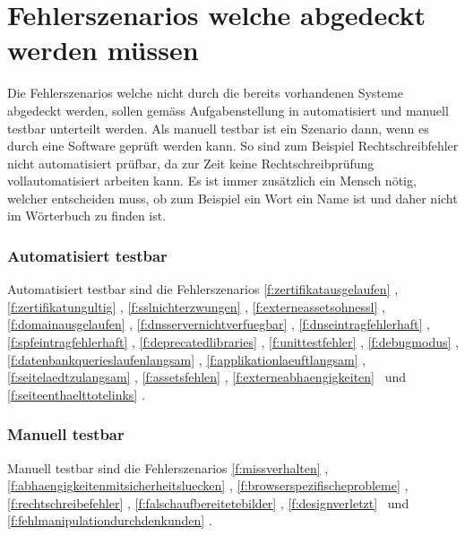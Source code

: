 \section{Fehlerszenarios welche abgedeckt werden müssen}
\label{sec:fehlerszenarios_welche_abgedeckt_werden_müssen}
Die Fehlerszenarios welche nicht durch die bereits vorhandenen Systeme abgedeckt werden, sollen gemäss Aufgabenstellung in automatisiert und manuell testbar unterteilt werden. Als manuell testbar ist ein Szenario dann, wenn es durch eine Software geprüft werden kann. So sind zum Beispiel Rechtschreibfehler nicht automatisiert prüfbar, da zur Zeit keine Rechtschreibprüfung vollautomatisiert arbeiten kann. Es ist immer zusätzlich ein Mensch nötig, welcher entscheiden muss, ob zum Beispiel ein Wort ein Name ist und daher nicht im Wörterbuch zu finden ist.

\subsubsection{Automatisiert testbar}
\label{ssub:automatisiert_testbar}

Automatisiert testbar sind die Fehlerszenarios \ref{f:zertifikatausgelaufen} \fzertifikatausgelaufen, \ref{f:zertifikatungultig} \fzertifikatungultig, \ref{f:sslnichterzwungen} \fsslnichterzwungen, \ref{f:externeassetsohnessl} \fexterneassetsohnessl, \ref{f:domainausgelaufen} \fdomainausgelaufen, \ref{f:dnsservernichtverfuegbar} \fdnsservernichtverfuegbar, \ref{f:dnseintragfehlerhaft} \fdnseintragfehlerhaft, \ref{f:spfeintragfehlerhaft} \fspfeintragfehlerhaft, \ref{f:deprecatedlibraries} \fdeprecatedlibraries, \ref{f:unittestfehler} \funittestfehler, \ref{f:debugmodus} \fdebugmodus, \ref{f:datenbankquerieslaufenlangsam} \fdatenbankquerieslaufenlangsam, \ref{f:applikationlaeuftlangsam} \fapplikationlaeuftlangsam, \ref{f:seitelaedtzulangsam} \fseitelaedtzulangsam, \ref{f:assetsfehlen} \fassetsfehlen, \ref{f:externeabhaengigkeiten} \fassetsfehlen ~und \ref{f:seiteenthaelttotelinks} \fseiteenthaelttotelinks.

\subsubsection{Manuell testbar}
\label{ssub:manuel_testbar}

Manuell testbar sind die Fehlerszenarios \ref{f:missverhalten} \fmissverhalten, \ref{f:abhaengigkeitenmitsicherheitsluecken} \fabhaengigkeitenmitsicherheitsluecken, \ref{f:browserspezifischeprobleme} \fbrowserspezifischeprobleme, \ref{f:rechtschreibefehler} \frechtschreibefehler, \ref{f:falschaufbereitetebilder} \ffalschaufbereitetebilder, \ref{f:designverletzt} \fdesignverletzt ~und \ref{f:fehlmanipulationdurchdenkunden} \ffehlmanipulationdurchdenkunden.
